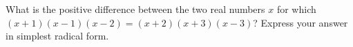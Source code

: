 What is the positive difference between the two real numbers $x$ for which $(x+1)(x-1)(x-2)=(x+2)(x+3)(x-3)$? Express your answer in simplest radical form.

